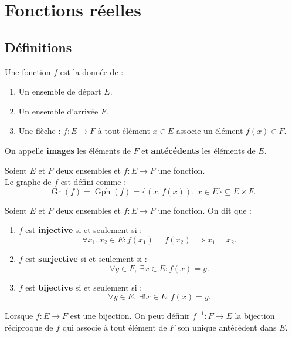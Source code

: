 \chapter{Fonctions réelles}
\def\arraystretch{1}

\section{Définitions}
\begin{definition}[Fonction]
	Une fonction $f$ est la donnée de :
	\begin{enumerate}
		\item Un ensemble de départ $E$.
		\item Un ensemble d'arrivée $F$.
		\item Une flèche : $ f : E \to F $ à tout élément $x \in E$ associe un élément $f(x) \in F$.
	\end{enumerate}		
	On appelle \textbf{images} les éléments de $F$ et \textbf{antécédents} les éléments de $E$.
\end{definition}

\begin{definition}
	Soient $E$ et $F$ deux ensembles et $f : E \to F$ une fonction.
	\\
	Le graphe de $f$ est défini comme :
	\[ \operatorname{Gr}(f) = \operatorname{Gph}(f) = \{ (x, f(x)),\ x \in E \} \subseteq E \times F. \] 
\end{definition}

\begin{definition}
	Soient $E$ et $F$ deux ensembles et $f : E \to F$ une fonction. On dit que :
    \begin{enumerate}
        \item $f$ est \textbf{injective} si et seulement si : 
        \[ \forall x_1, x_2 \in E : f(x_1) = f(x_2) \implies x_1 = x_2. \]
        \item $f$ est \textbf{surjective} si et seulement si : 
        \[ \forall y \in F,\ \exists x \in E : f(x) = y. \]
        \item $f$ est \textbf{bijective} si et seulement si :
        \[ \forall y \in E,\ \exists ! x \in E : f(x) = y. \]
    \end{enumerate}
\end{definition}

\begin{definition}
	Lorsque $f : E \to F$ est une bijection. On peut définir $f^{-1} : F \to E$ la bijection réciproque de $f$ qui associe à tout élément de $F$ son unique antécédent dans $E$.
\end{definition}

